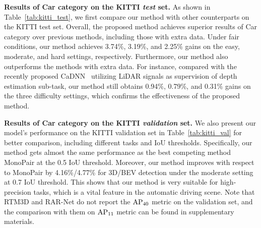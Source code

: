 \documentclass[10pt,twocolumn,letterpaper]{article}
\begin{document}
\begin{table}[!t]
    \centering
    \fontsize{7}{10}\selectfont
    \caption{{\bf Ablation studies} on the KITTI \emph{validation} set for the Car category.}
    \label{tab:ablation}
    \renewcommand\tabcolsep{3.0pt}
\end{table}

\noindent
{\bf Results of Car category on the KITTI \emph{test} set.}
As shown in Table~\ref{tab:kitti_test}, we first compare our method with other counterparts on the KITTI test set.
Overall,  the proposed method achieves superior results of Car category over previous methods, including those with extra data.
Under fair conditions, our method achieves 3.74\%, 3.19\%, and 2.25\% gains on the easy, moderate, and hard settings, respectively.
Furthermore, our method also outperforms the methods with extra data.
For instance, compared with the recently proposed CaDNN~\cite{reading2021categorical} utilizing LiDAR signals as supervision of depth estimation sub-task, our method still obtains 0.94\%, 0.79\%, and 0.31\% gains on the three difficulty settings, which confirms the effectiveness of the proposed method.


\noindent
{\bf Results of Car category on the KITTI \emph{validation} set.}
We also present our model’s performance on the KITTI validation set in Table~\ref{tab:kitti_val} for better comparison, including different tasks and IoU thresholds.
Specifically, our method gets almost the same performance as the best competing method MonoPair at the 0.5 IoU threshold. 
Moreover, our method improves with respect to MonoPair by 4.16\%/4.77\% for 3D/BEV detection under the moderate setting at 0.7 IoU threshold.
This shows that our method is very suitable for high-precision tasks, which is a vital feature in the automatic driving scene.
Note that RTM3D and RAR-Net do not report the ${\rm AP}_{40}$ metric on the validation set, and the comparison with them on ${\rm AP}_{11}$ metric can be found in supplementary materials.
\end{document}
